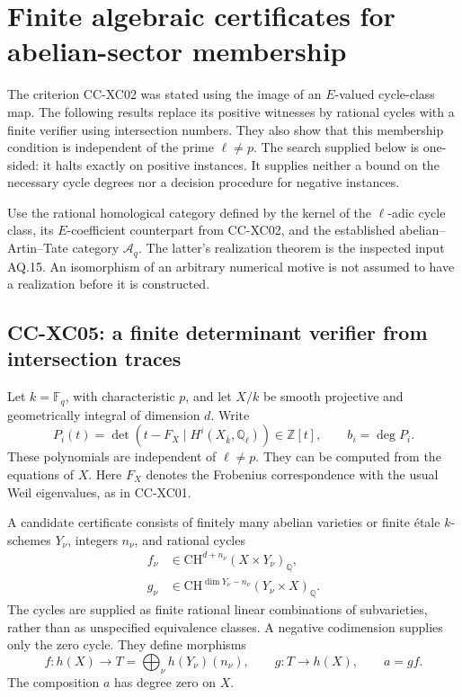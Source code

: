 \section{Finite algebraic certificates for abelian-sector membership}

The criterion CC-XC02 was stated using the image of an
\(E\)-valued cycle-class map.  The following results replace its
positive witnesses by rational cycles with a finite verifier using
intersection numbers.  They also show that this membership condition
is independent of the prime \(\ell\ne p\).  The search supplied below
is one-sided: it halts exactly on positive instances.  It supplies
neither a bound on the necessary cycle degrees nor a decision
procedure for negative instances.

Use the rational homological category defined by the kernel of
the \(\ell\)-adic cycle class, its \(E\)-coefficient counterpart
from CC-XC02, and the established abelian--Artin--Tate category
\(\mathcal A_q\).  The latter's realization theorem is the
inspected input AQ.15.  An isomorphism of an arbitrary numerical
motive is not assumed to have a realization before it is
constructed.

\subsection{CC-XC05: a finite determinant verifier from intersection traces}

Let \(k=\mathbb F_q\), with characteristic \(p\), and let
\(X/k\) be smooth projective and geometrically integral of
dimension \(d\).  Write
\[
 P_i(t)=\det(t-F_X\mid H^i(X_{\bar k},\mathbb Q_\ell))
       \in\mathbb Z[t],\qquad b_i=\deg P_i.
                                                        \tag{CC-XC.10}
\]
These polynomials are independent of \(\ell\ne p\).
They can be computed from the equations of \(X\).
Here \(F_X\) denotes the Frobenius correspondence with
the usual Weil eigenvalues, as in CC-XC01.

A candidate certificate consists of finitely many abelian
varieties or finite étale \(k\)-schemes \(Y_\nu\), integers
\(n_\nu\), and rational cycles
\[
 \begin{split}
 f_\nu&\in\mathrm{CH}^{d+n_\nu}(X\times Y_\nu)_{\mathbb Q},\\
 g_\nu&\in\mathrm{CH}^{\dim Y_\nu-n_\nu}
                                  (Y_\nu\times X)_{\mathbb Q}.
 \end{split}                                            \tag{CC-XC.11}
\]
The cycles are supplied as finite rational linear combinations
of subvarieties, rather than as unspecified equivalence classes.
A negative codimension supplies only the zero cycle.
They define morphisms
\[
 f:h(X)\longrightarrow T=\bigoplus_\nu h(Y_\nu)(n_\nu),
 \qquad g:T\longrightarrow h(X),\qquad a=gf.
                                                        \tag{CC-XC.12}
\]
The composition \(a\) has degree zero on \(X\).

